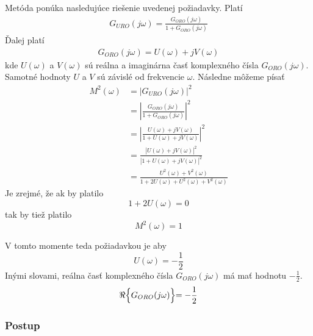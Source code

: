 \documentclass[a4paper, 10pt, ]{article}
\begin{document}
Metóda ponúka nasledujúce riešenie uvedenej požiadavky. Platí
\begin{align}
    G_{URO}(j\omega) = \frac{G_{ORO}(j\omega)}{1+G_{ORO}(j\omega)} 
\end{align}
Ďalej platí
\begin{align}
    G_{ORO}(j\omega) = U(\omega) + jV(\omega)
\end{align}
kde $U(\omega)$ a $V(\omega)$ sú reálna a imaginárna časť komplexného čísla $G_{ORO}(j\omega)$. Samotné hodnoty $U$ a $V$ sú závislé od frekvencie $\omega$. Následne môžeme písať
\begin{equation}
    \begin{aligned}
        M^2(\omega) 
        &= \left| G_{URO}(j\omega) \right|^2 \\
        &= \left| \frac{G_{ORO}(j\omega)}{1 + G_{ORO}(j\omega)} \right|^2 \\
        &= \left| \frac{U(\omega) + jV(\omega)}{1 + U(\omega) + jV(\omega)} \right|^2 \\
        &=  \frac{ \left|U(\omega) + jV(\omega) \right|^2}{ \left|1 + U(\omega) + jV(\omega) \right|^2} \\
        &= \frac{ U^2(\omega) + V^2(\omega) }{1 + 2U(\omega) + U^2(\omega) + V^2(\omega)} 
    \end{aligned}
\end{equation}
Je zrejmé, že ak by platilo
\begin{equation}
    1+2U(\omega) = 0
\end{equation}
tak by tiež platilo
\begin{equation}
    M^2(\omega) = 1
\end{equation}

V tomto momente teda požiadavkou je aby
\begin{equation}
    U(\omega) = -\frac{1}{2}
\end{equation}
Inými slovami, reálna časť komplexného čísla $G_{ORO}(j\omega)$ má mať hodnotu $-\frac{1}{2}$.
\begin{equation}
    \Re \Bigl\{ G_{ORO}(j\omega) \Bigl\} = -\frac{1}{2} 
\end{equation}






\subsubsection{Postup}
\end{document}
